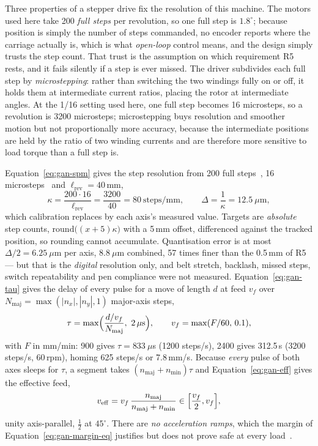 Three properties of a stepper drive fix the resolution of this machine. The motors used here take 200 \emph{full steps} per revolution, so one full step is $1.8^\circ$; because position is simply the number of steps commanded, no encoder reports where the carriage actually is, which is what \emph{open-loop} control means, and the design simply trusts the step count. That trust is the assumption on which requirement R5 rests, and it fails silently if a step is ever missed. The driver subdivides each full step by \emph{microstepping}: rather than switching the two windings fully on or off, it holds them at intermediate current ratios, placing the rotor at intermediate angles. At the 1/16 setting used here, one full step becomes 16 microsteps, so a revolution is 3200 microsteps; microstepping buys resolution and smoother motion but not proportionally more accuracy, because the intermediate positions are held by the ratio of two winding currents and are therefore more sensitive to load torque than a full step is.

Equation~\ref{eq:gan-spm} gives the step resolution from 200 full steps~\cite{stepperds}, 16 microsteps~\cite[p.~6]{a4988ds} and $\ell_{\mathrm{rev}}=40$\,mm,
\begin{equation}
\kappa=\frac{200\cdot16}{\ell_{\mathrm{rev}}}=\frac{3200}{40}=80\ \mathrm{steps/mm},\qquad\Delta=\frac1\kappa=12.5\ \mu\mathrm{m},
\label{eq:gan-spm}
\end{equation}
which calibration replaces by each axis's measured value. Targets are \emph{absolute} step counts, $\mathrm{round}\bigl((x+5)\kappa\bigr)$ with a 5\,mm offset, differenced against the tracked position, so rounding cannot accumulate. Quantisation error is at most $\Delta/2=6.25\ \mu$m per axis, $8.8\ \mu$m combined, 57 times finer than the 0.5\,mm of R5 --- but that is the \emph{digital} resolution only, and belt stretch, backlash, missed steps, switch repeatability and pen compliance were not measured.
Equation~\ref{eq:gan-tau} gives the delay of every pulse for a move of length $d$ at feed $v_f$ over $N_{\mathrm{maj}}=\max(|n_x|,|n_y|,1)$ major-axis steps,
\begin{equation}
\tau=\max\Bigl(\frac{d/v_f}{N_{\mathrm{maj}}},\ 2\,\mu\mathrm s\Bigr),\qquad v_f=\max(F/60,\,0.1),
\label{eq:gan-tau}
\end{equation}
with $F$ in mm/min: 900 gives $\tau=833\ \mu$s (1200 steps/s), 2400 gives 312.5\,\textmu s (3200 steps/s, 60\,rpm), homing 625 steps/s or 7.8\,mm/s. Because \emph{every} pulse of both axes sleeps for $\tau$, a segment takes $(n_{\mathrm{maj}}+n_{\mathrm{min}})\tau$ and Equation~\ref{eq:gan-eff} gives the effective feed,
\begin{equation}
v_{\mathrm{eff}}=v_f\,\frac{n_{\mathrm{maj}}}{n_{\mathrm{maj}}+n_{\mathrm{min}}}\in\Bigl[\frac{v_f}{2},v_f\Bigr],
\label{eq:gan-eff}
\end{equation}
unity axis-parallel, $\tfrac12$ at $45^\circ$. There are \emph{no acceleration ramps}, which the margin of Equation~\ref{eq:gan-margin-eq} justifies but does not prove safe at every load~\cite{acarnley2002}.

